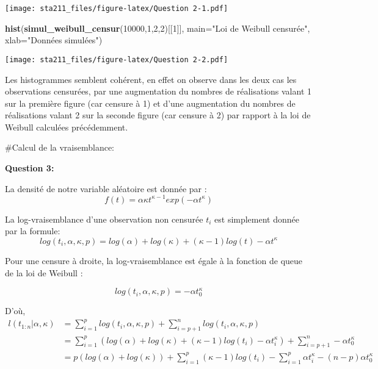 \documentclass[
]{article}
\newenvironment{Shaded}{\begin{snugshade}}{\end{snugshade}}
\newcommand{\DataTypeTok}[1]{\textcolor[rgb]{0.13,0.29,0.53}{#1}}
\newcommand{\DecValTok}[1]{\textcolor[rgb]{0.00,0.00,0.81}{#1}}
\newcommand{\KeywordTok}[1]{\textcolor[rgb]{0.13,0.29,0.53}{\textbf{#1}}}
\newcommand{\NormalTok}[1]{#1}
\newcommand{\StringTok}[1]{\textcolor[rgb]{0.31,0.60,0.02}{#1}}
\begin{document}
\texttt{[image: sta211\_files/figure-latex/Question 2-1.pdf]}

\begin{Shaded}
\begin{Highlighting}[]
\KeywordTok{hist}\NormalTok{(}\KeywordTok{simul_weibull_censur}\NormalTok{(}\DecValTok{10000}\NormalTok{,}\DecValTok{1}\NormalTok{,}\DecValTok{2}\NormalTok{,}\DecValTok{2}\NormalTok{)[[}\DecValTok{1}\NormalTok{]], }\DataTypeTok{main=}\StringTok{"Loi de Weibull censurée"}\NormalTok{, }\DataTypeTok{xlab=}\StringTok{"Données simulées"}\NormalTok{)}
\end{Highlighting}
\end{Shaded}

\texttt{[image: sta211\_files/figure-latex/Question 2-2.pdf]}

Les histogrammes semblent cohérent, en effet on observe dans les deux
cas les observations censurées, par une augmentation du nombres de
réalisations valant 1 sur la première figure (car censure à 1) et d'une
augmentation du nombres de réalisations valant 2 sur la seconde figure
(car censure à 2) par rapport à la loi de Weibull calculées
précédemment.

\#Calcul de la vraisemblance:

\textbf{Question 3:}

La densité de notre variable aléatoire est donnée par :
\[f(t) = \alpha \kappa t^{\kappa-1} exp(-\alpha t^{\kappa})\]

La log-vraisemblance d'une observation non censurée \(t_i\) est
simplement donnée par la formule:
\[log(t_i,\alpha,\kappa,p) = log(\alpha) + log(\kappa) + (\kappa-1)log(t) - \alpha t^{\kappa}\]

Pour une censure à droite, la log-vraisemblance est égale à la fonction
de queue de la loi de Weibull :

\[log(t_i,\alpha,\kappa,p) = -\alpha t_{0}^{\kappa}\]

D'où, \begin{align}
l(t_{1:n}| \alpha,\kappa) &= \sum_{i = 1}^{p} log(t_i,\alpha,\kappa,p) +  \sum_{i = p+1}^{n}log(t_i,\alpha,\kappa,p)\\

 &= \sum_{i = 1}^{p} (log(\alpha) + log(\kappa) + (\kappa-1)log(t_i) - \alpha t_{i}^{\kappa}) +\sum_{i = p+1}^{n}-\alpha t_{0}^{\kappa}\\

 &= p(log(\alpha) + log(\kappa)) +\sum_{i = 1}^{p} (\kappa-1)log(t_i) -\sum_{i = 1}^{p} \alpha t_{i}^{\kappa}  - (n-p)\alpha t_{0}^{\kappa}\\
\end{align}
\end{document}

